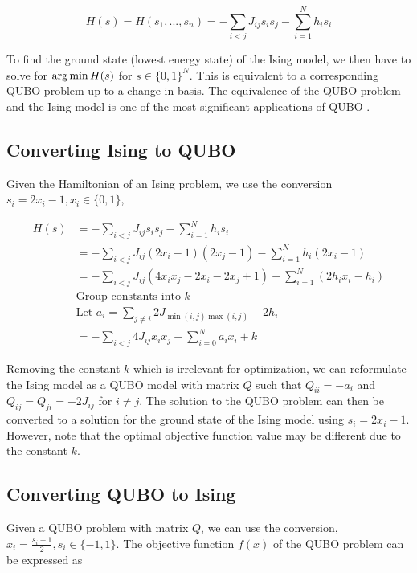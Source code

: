 \begin{equation}
    H(s) = H(s_1, ... , s_n) = -\sum_{i < j} J_{ij}s_i s_j - \sum_{i=1}^N h_i s_i
\end{equation}

To find the ground state (lowest energy state) of the Ising model, we then have to solve for $\operatorname*{arg\,min} H(s)$ for $s \in \{0, 1\}^N$. This is equivalent to a corresponding QUBO problem up to a change in basis. The equivalence of the QUBO problem and the Ising model is one of the most significant applications of QUBO \cite{b5}.

\subsection{Converting Ising to QUBO}
Given the Hamiltonian of an Ising problem, we use the conversion $s_i = 2x_i - 1, x_i \in \{0, 1\}$,

\begin{align}
    H(s) &= -\sum_{i < j} J_{ij}s_i s_j - \sum_{i=1}^N h_i s_i \nonumber\\
    &= -\sum_{i < j} J_{ij}(2x_i - 1) (2x_j - 1) - \sum_{i=1}^N h_i (2x_i - 1) \nonumber\\
    &= -\sum_{i < j} J_{ij}(4x_i x_j - 2x_i - 2x_j + 1) - \sum_{i=1}^N (2h_i x_i - h_i) \nonumber\\
    &\text{Group constants into $k$} \nonumber \\
    &\text{Let $a_i = \sum_{j \neq i} 2J_{\min(i,j)\max(i,j)} + 2h_i$} \nonumber \\
    &= -\sum_{i < j} 4J_{ij}x_i x_j - \sum_{i=0}^N a_{i}x_i + k \nonumber
\end{align}

Removing the constant $k$ which is irrelevant for optimization, we can reformulate the Ising model as a QUBO model with matrix $Q$ such that $Q_{ii} = -a_i$ and $Q_{ij} = Q_{ji} = -2J_{ij}$ for $i \neq j$. The solution to the QUBO problem can then be converted to a solution for the ground state of the Ising model using $s_i = 2x_i - 1$. However, note that the optimal objective function value may be different due to the constant $k$.

\subsection{Converting QUBO to Ising}

Given a QUBO problem with matrix $Q$, we can use the conversion, $x_i = \frac{s_i + 1}{2}, s_i \in \{-1, 1\}$. The objective function $f(x)$ of the QUBO problem can be expressed as

